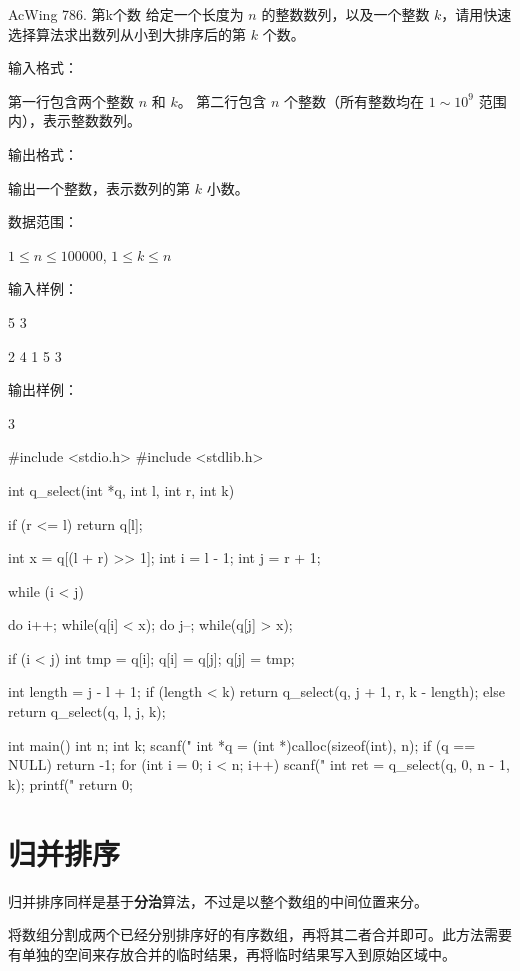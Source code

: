 \begin{titledbox}{AcWing 786. 第k个数}
给定一个长度为 $n$ 的整数数列，以及一个整数 $k$，请用快速选择算法求出数列从小到大排序后的第 $k$ 个数。

输入格式：

第一行包含两个整数 $n$ 和 $k$。
第二行包含 $n$ 个整数（所有整数均在 $1 \sim 10^9$ 范围内），表示整数数列。

输出格式：

输出一个整数，表示数列的第 $k$ 小数。

数据范围：

$1 \le n \le 100000$,
$1 \le k \le n$

输入样例：

5 3

2 4 1 5 3


输出样例：

3
\end{titledbox}


\begin{mycpptwocol}
#include <stdio.h>
#include <stdlib.h>

int q_select(int *q, int l,
             int r, int k) {
    if (r <= l) {
        return q[l];
    }

    int x = q[(l + r) >> 1];
    int i = l - 1;
    int j = r + 1;

    while (i < j) {
        do i++; while(q[i] < x);
        do j--; while(q[j] > x);

        if (i < j) {
            int tmp = q[i];
            q[i] = q[j];
            q[j] = tmp;
        }
    }

    int length = j - l + 1;
    if (length < k) {
        return q_select(q, j + 1, r,
            k - length);
    } else {
        return q_select(q, l, j, k);
    }
}

int main()
{
    int n;
    int k;
    scanf("%
    int *q = (int *)calloc(sizeof(int), n);
    if (q == NULL) {
        return -1;
    }
    for (int i = 0; i < n; i++) {
        scanf("%
    }
    int ret = q_select(q, 0, n - 1, k);
    printf("%
    return 0;
}
\end{mycpptwocol}

\section{归并排序}
归并排序同样是基于\textbf{分治}算法，不过是以整个数组的中间位置来分。

将数组分割成两个已经分别排序好的有序数组，再将其二者合并即可。此方法需要有单独的空间来存放合并的临时结果，再将临时结果写入到原始区域中。


